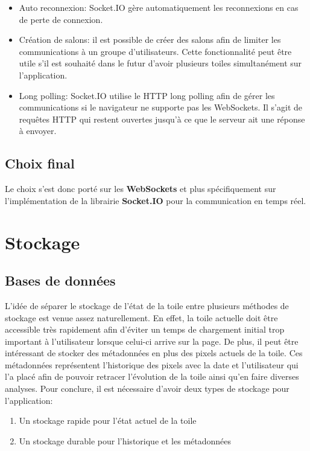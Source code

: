 \begin{itemize}
  \item Auto reconnexion: Socket.IO gère automatiquement les reconnexions en cas de perte de connexion.
  \item Création de salons: il est possible de créer des salons afin de limiter les communications à un groupe d'utilisateurs. Cette fonctionnalité peut être utile s'il est souhaité dans le futur d'avoir plusieurs toiles simultanément sur l'application.
  \item Long polling: Socket.IO utilise le HTTP long polling afin de gérer les communications si le navigateur ne supporte pas les WebSockets. Il s'agit de requêtes HTTP qui restent ouvertes jusqu'à ce que le serveur ait une réponse à envoyer.
\end{itemize}

\subsection{Choix final}

Le choix s'est donc porté sur les \textbf{WebSockets} et plus spécifiquement sur l'implémentation de la librairie \textbf{Socket.IO} pour la communication en temps réel.

\section{Stockage}

\subsection{Bases de données}

L'idée de séparer le stockage de l'état de la toile entre plusieurs méthodes de stockage est venue assez naturellement. En effet, la toile actuelle doit être accessible très rapidement afin d'éviter un temps de chargement initial trop important à l'utilisateur lorsque celui-ci arrive sur la page. De plus, il peut être intéressant de stocker des métadonnées en plus des pixels actuels de la toile. Ces métadonnées représentent l'historique des pixels avec la date et l'utilisateur qui l'a placé afin de pouvoir retracer l'évolution de la toile ainsi qu'en faire diverses analyses. Pour conclure, il est nécessaire d'avoir deux types de stockage pour l'application:

\begin{enumerate}
  \item Un stockage rapide pour l'état actuel de la toile
  \item Un stockage durable pour l'historique et les métadonnées
\end{enumerate}

